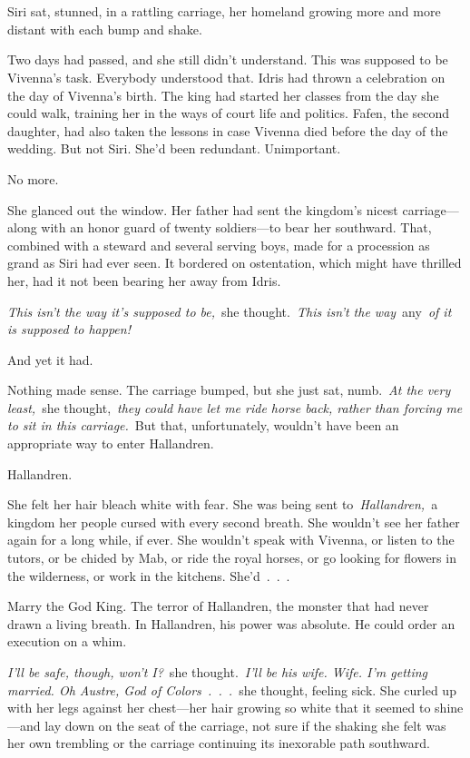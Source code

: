 \chapter{}

Siri sat, stunned, in a rattling carriage, her homeland growing more and more distant with each bump and shake.

Two days had passed, and she still didn’t understand. This was supposed to be Vivenna’s task. Everybody understood that. Idris had thrown a celebration on the day of Vivenna’s birth. The king had started her classes from the day she could walk, training her in the ways of court life and politics. Fafen, the second daughter, had also taken the lessons in case Vivenna died before the day of the wedding. But not Siri. She’d been redundant. Unimportant.

No more.

She glanced out the window. Her father had sent the kingdom’s nicest carriage—along with an honor guard of twenty soldiers—to bear her southward. That, combined with a steward and several serving boys, made for a procession as grand as Siri had ever seen. It bordered on ostentation, which might have thrilled her, had it not been bearing her away from Idris.

\textit{This isn’t the way it’s supposed to be,}~she thought.~\textit{This isn’t the way}~any~\textit{of it is supposed to happen!}

And yet it had.

Nothing made sense. The carriage bumped, but she just sat, numb.~\textit{At the very least,}~she thought,~\textit{they could have let me ride horse back, rather than forcing me to sit in this carriage.}~But that, unfortunately, wouldn’t have been an appropriate way to enter Hallandren.

Hallandren.

She felt her hair bleach white with fear. She was being sent to~\textit{Hallandren,}~a kingdom her people cursed with every second breath. She wouldn’t see her father again for a long while, if ever. She wouldn’t speak with Vivenna, or listen to the tutors, or be chided by Mab, or ride the royal horses, or go looking for flowers in the wilderness, or work in the kitchens. She’d~.~.~.

Marry the God King. The terror of Hallandren, the monster that had never drawn a living breath. In Hallandren, his power was absolute. He could order an execution on a whim.

\textit{I’ll be safe, though, won’t I?}~she thought.~\textit{I’ll be his wife. Wife. I’m getting married. Oh Austre, God of Colors~.~.~.}~she thought, feeling sick. She curled up with her legs against her chest—her hair growing so white that it seemed to shine—and lay down on the seat of the carriage, not sure if the shaking she felt was her own trembling or the carriage continuing its inexorable path southward.

